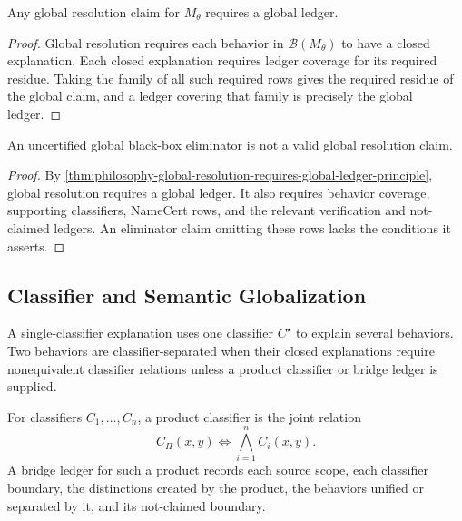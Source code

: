 \begin{theorem}
\label{thm:philosophy-global-resolution-requires-global-ledger-principle}
Any global resolution claim for $M_\theta$ requires a global ledger.
\end{theorem}
\begin{proof}
Global resolution requires each behavior in $\mathcal B(M_\theta)$ to
have a closed explanation. Each closed explanation requires ledger
coverage for its required residue. Taking the family of all such
required rows gives the required residue of the global claim, and a
ledger covering that family is precisely the global ledger.
\end{proof}

\begin{theorem}
\label{thm:philosophy-no-uncertified-global-black-box-eliminator}
An uncertified global black-box eliminator is not a valid global
resolution claim.
\end{theorem}
\begin{proof}
By
\autoref{thm:philosophy-global-resolution-requires-global-ledger-principle},
global resolution requires a global ledger. It also requires behavior
coverage, supporting classifiers, NameCert rows, and the relevant
verification and not-claimed ledgers. An eliminator claim omitting these
rows lacks the conditions it asserts.
\end{proof}

\subsection{Classifier and Semantic Globalization}
\label{subsec:philosophy-classifier-semantic-globalization}

\begin{definition}
\label{def:philosophy-single-classifier-explanation}
A single-classifier explanation uses one classifier $C^\star$ to explain
several behaviors. Two behaviors are classifier-separated when their
closed explanations require nonequivalent classifier relations unless a
product classifier or bridge ledger is supplied.
\end{definition}

\begin{definition}
\label{def:philosophy-product-classifier-bridge-ledger}
For classifiers $C_1,\ldots,C_n$, a product classifier is the joint
relation
$$
C_\Pi(x,y)
\Longleftrightarrow
\bigwedge_{i=1}^{n} C_i(x,y).
$$
A bridge ledger for such a product records each source scope, each
classifier boundary, the distinctions created by the product, the
behaviors unified or separated by it, and its not-claimed boundary.
\end{definition}

